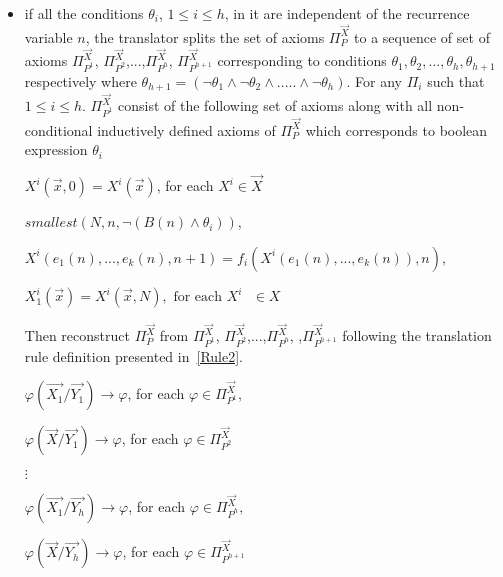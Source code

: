 \begin{itemize}
	\item if all the conditions $\theta_i$, $1\leq i\leq h$,
	in it are independent of the recurrence variable $n$, the translator splits the set of axioms $\Pi_P^{\vec{X}}$ to a sequence of set of axioms $\Pi_{P^{1}}^{\vec{X}}$, $\Pi_{P^{2}}^{\vec{X}}$,...,$\Pi_{P^{h}}^{\vec{X}}$, $\Pi_{P^{h+1}}^{\vec{X}}$ corresponding to conditions $\theta_1, \theta_2,...,\theta_h, \theta_{h+1}$ respectively where $\theta_{h+1}   = (\neg \theta_1 \land \neg \theta_2 \land..... \land \neg \theta_h)$.
	For any $\Pi_i$ such that $1\leq i\leq h$. $\Pi_{P^{1}}^{\vec{X}}$ consist of the following set of axioms along with all non-conditional inductively defined axioms of $\Pi_P^{\vec{X}}$  which corresponds to boolean expression $\theta_i$
	
    \vspace{2mm}
	$X^i(\vec{x},0) = X^i(\vec{x})$,  for each $X^i \in  \vec{X}$

	\vspace{2mm}
	
	$smallest(N, n, \neg (B(n) \land \theta_i))$, 
	
	\vspace{2mm}
	$X^i(e_1(n), ..., e_k(n),n+1) = f_i(X^i(e_1(n), ...,e_k(n)),n)$,

	\vspace{2mm} 
	$X^i_1(\vec{x}) = X^i(\vec{x}, N), \text{ for each $X^i$ $\in X$ }$

	\vspace{2mm}

     Then reconstruct $\Pi_P^{\vec{X}}$ from $\Pi_{P^{1}}^{\vec{X}}$, $\Pi_{P^{2}}^{\vec{X}}$,...,$\Pi_{P^{h}}^{\vec{X}}$, ,$\Pi_{P^{h+1}}^{\vec{X}}$ following the translation rule definition presented in~\ref{Rule2}.
     
	\vspace{2mm}
	$\varphi(\vec{X_1}/\vec{Y_1}) \rightarrow \varphi$, for each $\varphi \in \Pi_{P^{1}}^{\vec{X}},$

	\vspace{2mm}
	$\varphi(\vec{X}/\vec{Y_1}) \rightarrow \varphi$, for each $\varphi \in \Pi_{P^{2}}^{\vec{X}}$
	\vspace{2mm}
	
    $\vdots$
    
	\vspace{2mm}
	$\varphi(\vec{X_1}/\vec{Y_h}) \rightarrow \varphi$, for each $\varphi \in \Pi_{P^{h}}^{\vec{X}},$

	\vspace{2mm}
	$\varphi(\vec{X}/\vec{Y_h}) \rightarrow \varphi$, for each $\varphi \in \Pi_{P^{h+1}}^{\vec{X}}$
	\vspace{2mm}
	

\end{itemize}
